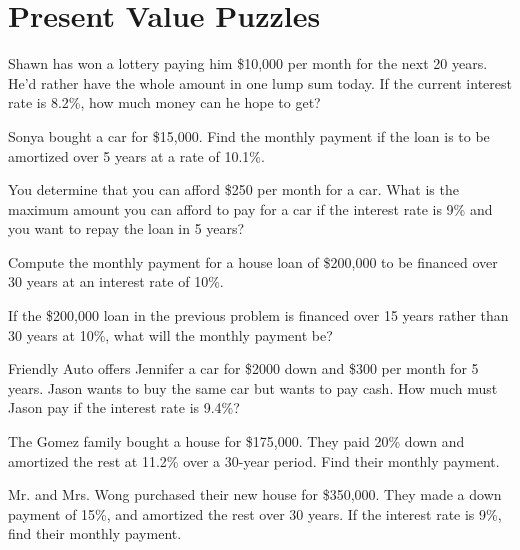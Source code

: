 \section{Present Value Puzzles}

\begin{puzzle}
    Shawn has won a lottery paying him \$10,000 per month for the next 20 years. He'd rather have the whole amount in one lump sum today. If the current interest rate is 8.2\%, how much money can he hope to get?
    \end{puzzle}
    
    \begin{puzzle}
    Sonya bought a car for \$15,000. Find the monthly payment if the loan is to be amortized over 5 years at a rate of 10.1\%.
    \end{puzzle}
    
    \begin{puzzle}
    You determine that you can afford \$250 per month for a car. What is the maximum amount you can afford to pay for a car if the interest rate is 9\% and you want to repay the loan in 5 years?
    \end{puzzle}
    
    \begin{puzzle}
    Compute the monthly payment for a house loan of \$200,000 to be financed over 30 years at an interest rate of 10\%.
    \end{puzzle}
    
    \begin{puzzle}
    If the \$200,000 loan in the previous problem is financed over 15 years rather than 30 years at 10\%, what will the monthly payment be?
    \end{puzzle}
    
    \begin{puzzle}
    Friendly Auto offers Jennifer a car for \$2000 down and \$300 per month for 5 years. Jason wants to buy the same car but wants to pay cash. How much must Jason pay if the interest rate is 9.4\%?
    \end{puzzle}
    
    \begin{puzzle}
    The Gomez family bought a house for \$175,000. They paid 20\% down and amortized the rest at 11.2\% over a 30-year period. Find their monthly payment.
    \end{puzzle}
    
    \begin{puzzle}
        Mr. and Mrs. Wong purchased their new house for \$350,000. They made a down payment of 15\%, and amortized the rest over 30 years. If the interest rate is 9\%, find their monthly payment.
        \end{puzzle}
        

